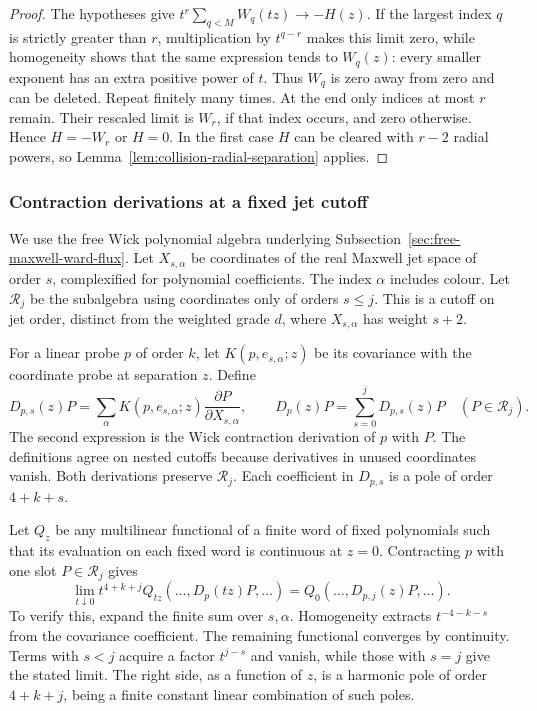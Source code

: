 \begin{proof}
The hypotheses give
$t^r\sum_{q<M}W_q(tz)\to-H(z)$. If the largest index $q$ is
strictly greater than $r$, multiplication by $t^{q-r}$ makes this
limit zero, while homogeneity shows that the same expression tends to
$W_q(z)$: every smaller exponent has an extra positive power of $t$.
Thus $W_q$ is zero away from zero and can be deleted. Repeat finitely
many times. At the end only indices at most $r$ remain. Their rescaled
limit is $W_r$, if that index occurs, and zero otherwise. Hence
$H=-W_r$ or $H=0$. In the first case $H$ can be cleared with $r-2$
radial powers, so Lemma~\ref{lem:collision-radial-separation} applies.
\end{proof}

\subsubsection{Contraction derivations at a fixed jet cutoff}
We use the free Wick polynomial algebra underlying
Subsection~\ref{sec:free-maxwell-ward-flux}. Let $X_{s,\alpha}$ be
coordinates of the real Maxwell jet space of order $s$, complexified
for polynomial coefficients. The index $\alpha$ includes colour.
Let $\mathcal R_j$ be the subalgebra using coordinates only of orders
$s\leq j$. This is a cutoff on jet order, distinct from the weighted
grade $d$, where $X_{s,\alpha}$ has weight $s+2$.

For a linear probe $p$ of order $k$, let $K(p,e_{s,\alpha};z)$ be its
covariance with the coordinate probe at separation $z$. Define
\[
 D_{p,s}(z)P=\sum_\alpha K(p,e_{s,\alpha};z)
                     \frac{\partial P}{\partial X_{s,\alpha}},
 \qquad D_p(z)P=\sum_{s=0}^jD_{p,s}(z)P
                      \quad(P\in\mathcal R_j).
\]
The second expression is the Wick contraction derivation of $p$ with
$P$. The definitions agree on nested cutoffs because derivatives in
unused coordinates vanish. Both derivations preserve $\mathcal R_j$.
Each coefficient in $D_{p,s}$ is a pole of order $4+k+s$.

Let $Q_z$ be any multilinear functional of a finite word of fixed
polynomials such that its evaluation on each fixed word is continuous
at $z=0$. Contracting $p$ with one slot $P\in\mathcal R_j$ gives
\begin{equation}\label{eq:collision-single-leading}
 \lim_{t\downarrow0}t^{4+k+j}
 Q_{tz}(\ldots,D_p(tz)P,\ldots)
 =Q_0(\ldots,D_{p,j}(z)P,\ldots).
\end{equation}
To verify this, expand the finite sum over $s,\alpha$. Homogeneity
extracts $t^{-4-k-s}$ from the covariance coefficient. The remaining
functional converges by continuity. Terms with $s<j$ acquire a factor
$t^{j-s}$ and vanish, while those with $s=j$ give the stated limit.
The right side, as a function of $z$, is a harmonic pole of order
$4+k+j$, being a finite constant linear combination of such poles.

